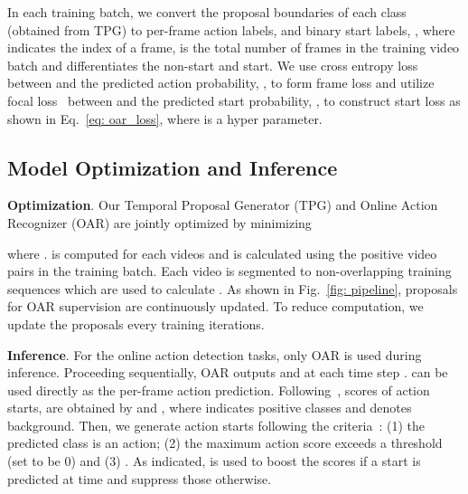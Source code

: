 \documentclass[final]{cvpr}
\begin{document}
In each training batch, we convert the proposal boundaries of each class  (obtained from TPG) to per-frame action labels,  and binary start labels, , where  indicates the index of a frame,  is the total number of frames in the training video batch and  differentiates the non-start and start. We use cross entropy loss between  and the predicted action probability, , to form frame loss and utilize focal loss~\cite{lin2017focal} between  and the predicted start probability, , to construct start loss as shown in Eq.~\ref{eq: oar_loss}, where  is a hyper parameter.


\subsection{Model Optimization and Inference}

\textbf{Optimization}. Our Temporal Proposal Generator (TPG) and Online Action Recognizer (OAR) are jointly optimized by minimizing


where .  is computed for each videos and  is calculated using the positive video pairs in the training batch. Each video is segmented to non-overlapping training sequences which are used to calculate . As shown in Fig.~\ref{fig: pipeline}, proposals for OAR supervision are continuously updated. To reduce computation, we update the proposals every  training iterations. 


\textbf{Inference}. For the online action detection tasks, only OAR is used during inference. Proceeding sequentially, OAR outputs  and  at each time step .  can be used directly as the per-frame action prediction. Following~\cite{gao2019startnet}, scores of action starts, are obtained by  and , where  indicates positive classes and  denotes background. Then, we generate action starts following the criteria~\cite{shou2018online,gao2019startnet}: (1) the predicted class  is an action; (2) the maximum action score  exceeds a threshold (set to be 0) and (3) . As indicated,  is used to boost the scores if a start is predicted at time  and suppress those otherwise.
\end{document}
